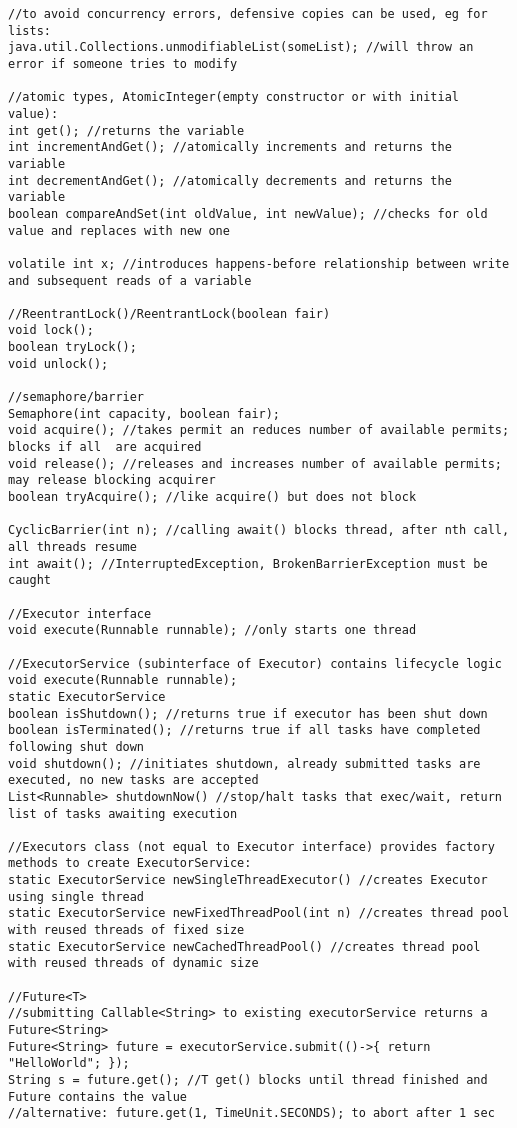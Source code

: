 \documentclass{article}
\begin{document}
\begin{verbatim}
//to avoid concurrency errors, defensive copies can be used, eg for lists:
java.util.Collections.unmodifiableList(someList); //will throw an error if someone tries to modify

//atomic types, AtomicInteger(empty constructor or with initial value):
int get(); //returns the variable
int incrementAndGet(); //atomically increments and returns the variable
int decrementAndGet(); //atomically decrements and returns the variable
boolean compareAndSet(int oldValue, int newValue); //checks for old value and replaces with new one

volatile int x; //introduces happens-before relationship between write and subsequent reads of a variable

//ReentrantLock()/ReentrantLock(boolean fair)
void lock();
boolean tryLock();
void unlock();

//semaphore/barrier
Semaphore(int capacity, boolean fair);
void acquire(); //takes permit an reduces number of available permits; blocks if all  are acquired
void release(); //releases and increases number of available permits; may release blocking acquirer
boolean tryAcquire(); //like acquire() but does not block

CyclicBarrier(int n); //calling await() blocks thread, after nth call, all threads resume
int await(); //InterruptedException, BrokenBarrierException must be caught

//Executor interface
void execute(Runnable runnable); //only starts one thread

//ExecutorService (subinterface of Executor) contains lifecycle logic
void execute(Runnable runnable);
static ExecutorService
boolean isShutdown(); //returns true if executor has been shut down
boolean isTerminated(); //returns true if all tasks have completed following shut down
void shutdown(); //initiates shutdown, already submitted tasks are executed, no new tasks are accepted
List<Runnable> shutdownNow() //stop/halt tasks that exec/wait, return list of tasks awaiting execution

//Executors class (not equal to Executor interface) provides factory methods to create ExecutorService:
static ExecutorService newSingleThreadExecutor() //creates Executor using single thread
static ExecutorService newFixedThreadPool(int n) //creates thread pool with reused threads of fixed size
static ExecutorService newCachedThreadPool() //creates thread pool with reused threads of dynamic size

//Future<T>
//submitting Callable<String> to existing executorService returns a Future<String>
Future<String> future = executorService.submit(()->{ return "HelloWorld"; });
String s = future.get(); //T get() blocks until thread finished and Future contains the value
//alternative: future.get(1, TimeUnit.SECONDS); to abort after 1 sec


\end{verbatim}
\end{document}
